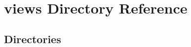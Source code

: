 \section{views Directory Reference}
\label{dir_810e6677597a758262d47477e73b118d}
\subsection*{Directories}
\begin{DoxyCompactItemize}
\end{DoxyCompactItemize}
